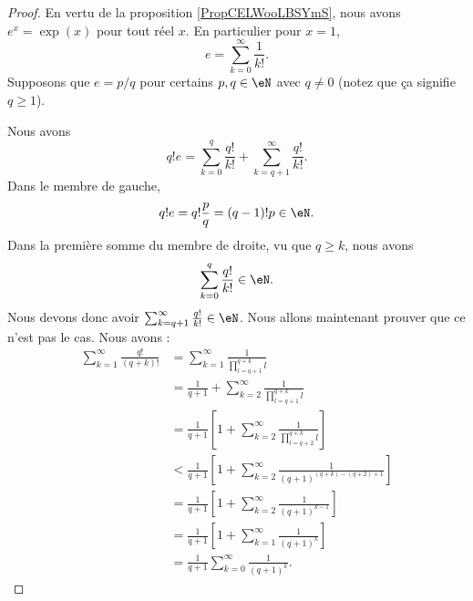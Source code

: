 \begin{proof}
	En vertu de la proposition \ref{PropCELWooLBSYmS}, nous avons \( e^x=\exp(x)\) pour tout réel \( x\). En particulier pour \( x=1\),
	\begin{equation}
		e=\sum_{k=0}^{\infty}\frac{1}{ k! }.
	\end{equation}
	Supposons que \( e=p/q\) pour certains \( p,q\in \eN\) avec \( q\neq 0\) (notez que ça signifie \( q\geq 1\)).

	Nous avons
	\begin{equation}
		q!e=\sum_{k=0}^q\frac{ q! }{ k! }+\sum_{k=q+1}^{\infty}\frac{ q! }{ k! }.
	\end{equation}
	Dans le membre de gauche,
	\begin{equation}
		q!e=q!\frac{ p }{ q }=(q-1)!p\in \eN.
	\end{equation}
	Dans la première somme du membre de droite, vu que \( q\geq k\), nous avons
	\begin{equation}
		\sum_{k=0}^q\frac{ q! }{ k! }\in \eN.
	\end{equation}
	Nous devons donc avoir \( \sum_{k=q+1}^{\infty}\frac{ q! }{ k! }\in \eN\). Nous allons maintenant prouver que ce n'est pas le cas. Nous avons :
	\begin{subequations}
		\begin{align}
			\sum_{k=1}^{\infty}\frac{ q! }{ (q+k)! } & =\sum_{k=1}^{\infty}\frac{1}{ \prod_{l=q+1}^{q+k}l }                                  \\
			                                         & =\frac{1}{ q+1 }+\sum_{k=2}^{\infty}\frac{1}{ \prod_{l=q+1}^{q+k}l }                  \\
			                                         & =\frac{1}{ q+1 }\left[ 1+\sum_{k=2}^{\infty}\frac{1}{ \prod_{l=q+2}^{q+k}l } \right]  \\
			                                         & <\frac{1}{ q+1 }\left[ 1+\sum_{k=2}^{\infty}\frac{1}{ (q+1)^{(q+k)-(q+2)+1} } \right] \\
			                                         & =\frac{1}{ q+1 }\left[ 1+\sum_{k=2}^{\infty}\frac{1}{ (q+1)^{k-1} } \right]           \\
			                                         & =\frac{1}{ q+1 }\left[ 1+\sum_{k=1}^{\infty}\frac{1}{ (q+1)^k } \right]               \\
			                                         & =\frac{1}{ q+1 }\sum_{k=0}^{\infty}\frac{1}{ (q+1)^k }.
		\end{align}
	\end{subequations}

\end{proof}
